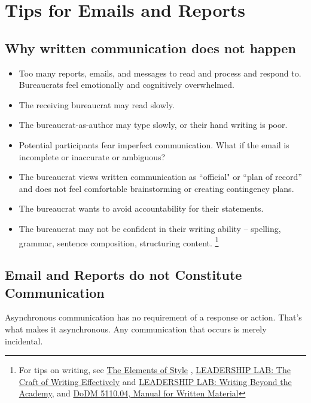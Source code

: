 \section{Tips for Emails and Reports}




\subsection*{Why written communication does not happen\label{sec:written-comm-does-not-happen}}
\begin{itemize}
    \item Too many reports, emails, and messages to read and process and respond to. Bureaucrats feel emotionally and cognitively overwhelmed.
\item The receiving bureaucrat may read slowly.
\item The bureaucrat-as-author may type slowly, or their hand writing is poor.
\item Potential participants fear imperfect communication. What if the email is incomplete or inaccurate or ambiguous?
\item The bureaucrat views written communication as ``official" or ``plan of record'' and does not feel comfortable brainstorming or creating contingency plans.
\item The bureaucrat wants to avoid accountability for their statements.
\item The bureaucrat may not be confident in their writing ability -- spelling, grammar, sentence composition, structuring content. \footnote{For tips on writing, see 
\href{https://en.wikipedia.org/wiki/The_Elements_of_Style}{The Elements of Style}
, 
\href{https://www.youtube.com/watch?v=vtIzMaLkCaM}{LEADERSHIP LAB: The Craft of Writing Effectively} and \href{https://www.youtube.com/watch?v=aFwVf5a3pZM}{LEADERSHIP LAB: Writing Beyond the Academy},
and
\href{https://www.google.com/search?q=dodm+5110.04}{DoDM 5110.04, Manual for Written Material}}
\end{itemize}



\subsection*{Email and Reports do not Constitute Communication}
Asynchronous communication has no requirement of a response or action. That's what makes it asynchronous. Any communication that occurs is merely incidental.

